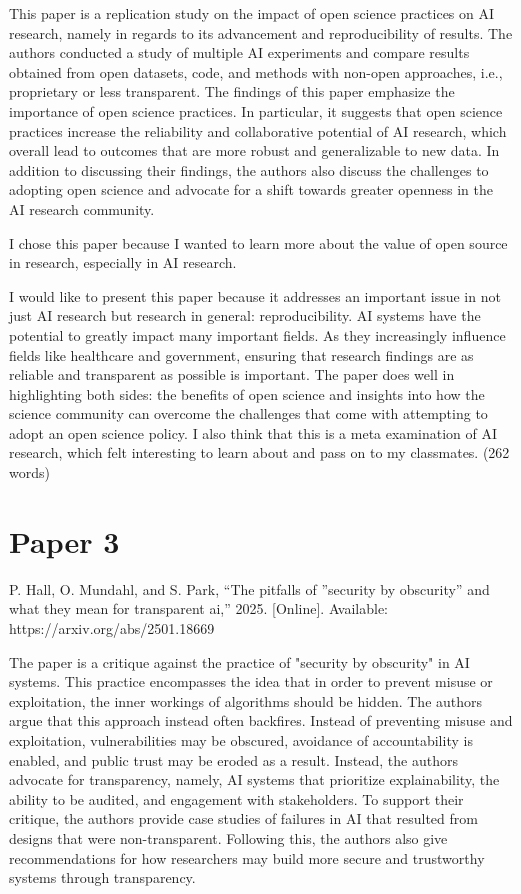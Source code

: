 \documentclass[12pt, letterpaper]{article}
\begin{document}
This paper is a replication study on the impact of open science practices on AI research, namely in regards to its advancement and reproducibility of results. The authors conducted a study of multiple AI experiments and compare results obtained from open datasets, code, and methods with non-open approaches, i.e., proprietary or less transparent. The findings of this paper emphasize the importance of open science practices. In particular, it suggests that open science practices increase the reliability and collaborative potential of AI research, which overall lead to outcomes that are more robust and generalizable to new data. In addition to discussing their findings, the authors also discuss the challenges to adopting open science and advocate for a shift towards greater openness in the AI research community.

I chose this paper because I wanted to learn more about the value of open source in research, especially in AI research.

I would like to present this paper because it addresses an important issue in not just AI research but research in general: reproducibility. AI systems have the potential to greatly impact many important fields. As they increasingly influence fields like healthcare and government, ensuring that research findings are as reliable and transparent as possible is important. The paper does well in highlighting both sides: the benefits of open science and insights into how the science community can overcome the challenges that come with attempting to adopt an open science policy. I also think that this is a meta examination of AI research, which felt interesting to learn about and pass on to my classmates. (262 words)

\section{Paper 3}
\label{sec:Paper 3}
P. Hall, O. Mundahl, and S. Park, “The pitfalls of ”security by obscurity” and what they mean for transparent ai,” 2025. [Online]. Available: https://arxiv.org/abs/2501.18669

The paper is a critique against the practice of "security by obscurity" in AI systems. This practice encompasses the idea that in order to prevent misuse or exploitation, the inner workings of algorithms should be hidden. The authors argue that this approach instead often backfires. Instead of preventing misuse and exploitation, vulnerabilities may be obscured, avoidance of accountability is enabled, and public trust may be eroded as a result. Instead, the authors advocate for transparency, namely, AI systems that prioritize explainability, the ability to be audited, and engagement with stakeholders. To support their critique, the authors provide case studies of failures in AI that resulted from designs that were non-transparent. Following this, the authors also give recommendations for how researchers may build more secure and trustworthy systems through transparency.
\end{document}
